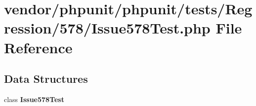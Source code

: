 \section{vendor/phpunit/phpunit/tests/\+Regression/578/\+Issue578\+Test.php File Reference}
\label{_issue578_test_8php}
\subsection*{Data Structures}
\begin{DoxyCompactItemize}
\item 
class {\bf Issue578\+Test}
\end{DoxyCompactItemize}
